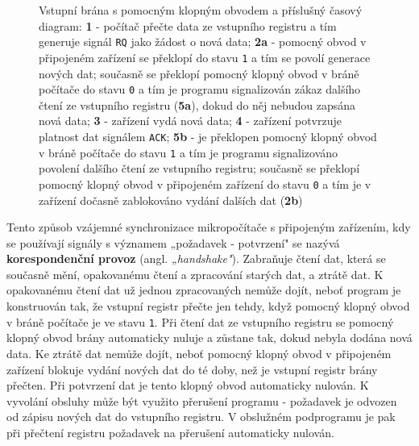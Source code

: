       \begin{figure}[ht!]
        \centering  
            {}
            {}
        \caption{Vstupní brána s pomocným klopným obvodem a příslušný časový diagram:
                 \textbf{1} - počítač přečte data ze vstupního registru a tím generuje signál 
                 \texttt{RQ} jako žádost o nová data; \textbf{2a} - pomocný obvod v připojeném 
                 zařízení se překlopí do stavu \texttt{1} a tím se povolí generace nových dat; 
                 současně se překlopí pomocný klopný obvod v bráně počítače do stavu \texttt{0} a 
                 tím je programu signalizován zákaz dalšího čtení ze vstupního registru 
                 (\textbf{5a}), dokud do něj nebudou zapsána nová data; \textbf{3}  - zařízení vydá 
                 nová data; \textbf{4}  - zařízení potvrzuje platnost dat signálem \texttt{ACK}; 
                 \textbf{5b} - je překlopen pomocný klopný obvod v bráně počítače do stavu 
                 \texttt{1} a tím je programu signalizováno povolení dalšího čtení ze vstupního 
                 registru; současně se překlopí pomocný klopný obvod v připojeném zařízení do stavu 
                 \texttt{0} a tím je v zařízení dočasně zablokováno vydání dalších dat  
                 (\textbf{2b})
                 }
        \label{MIT:fig_sbernice5960}
      \end{figure}
      
      Tento způsob vzájemné synchronizace mikropočítače s připojeným zařízením, kdy se používají
      signály s významem „požadavek - potvrzení" se nazývá \textbf{korespondenční provoz} (angl.
      \emph{„handshake"}). Zabraňuje čtení dat, která se současně mění, opakovanému čtení a
      zpracování starých dat, a ztrátě dat. K opakovanému čtení dat už jednou zpracovaných nemůže
      dojít, neboť program je konstruován tak, že vstupní registr přečte jen tehdy, když pomocný
      klopný obvod v bráně počítače je ve stavu \texttt{1}. Při čtení dat ze vstupního registru se
      pomocný klopný obvod brány automaticky nuluje a zůstane tak, dokud nebyla dodána nová data. Ke
      ztrátě dat nemůže dojít, neboť pomocný klopný obvod v připojeném zařízení blokuje vydání
      nových dat do té doby, než je vstupní registr brány přečten. Při potvrzení dat je tento klopný
      obvod automaticky nulován. K vyvolání obsluhy může být využito přerušení programu - požadavek
      je odvozen od zápisu nových dat do vstupního registru. V obslužném podprogramu je pak při
      přečtení registru požadavek na přerušení automaticky nulován.
      
